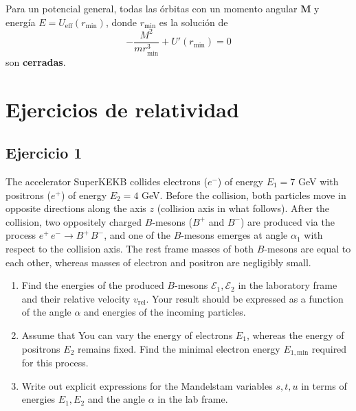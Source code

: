 \documentclass[]{report}
\numberwithin{equation}{section}
\newcommand{\0}{\textcolor{gray}{0}}
\newcommand{\eff}[1]{#1_\mathrm{eff}}
\newcommand{\Ueff}{\eff{U}}
\begin{document}
Para un potencial general, todas las órbitas con un momento angular \(\mathbf{M}\) y energía \(E = \Ueff(r_\mathrm{min})\), donde \(r_\mathrm{min}\) es la solución de
\begin{equation}
	-\frac{M^2}{m r_\mathrm{min}^3} + U'(r_\mathrm{min}) = 0 \label{EDO_orb_cerrada}
\end{equation}
son \textbf{cerradas}.

\chapter{Ejercicios de relatividad}
\section{Ejercicio 1}
The accelerator SuperKEKB collides electrons (\(e^{-}\)) of energy \(E_{1} = 7\) GeV with positrons (\(e^{+}\)) of energy \(E_{2} = 4\) GeV. Before the collision, both particles move in opposite directions along the axis \(z\) (collision axis in what follows). After the collision, two oppositely charged \(B\)-mesons (\(B^{+}\) and \(B^{-}\)) are produced via the process \(e^{+}\, e^{-} \rightarrow B^{+}\, B^{-}\), and one of the \(B\)-mesons emerges at angle \(\alpha_{1}\) with respect to the collision axis. The rest frame masses of both \(B\)-mesons are equal to each other, whereas masses of electron and positron are negligibly small.
\begin{enumerate}
	\item[a)] Find the energies of the produced \(B\)-mesons \(\mathcal{E}_{1}, \mathcal{E}_{2}\) in the laboratory frame and their relative velocity \(v_{\mathrm{rel}}\). Your result should be expressed as a function of the angle \(\alpha\) and energies of the incoming particles.
	\item[b)] Assume that You can vary the energy of electrons \(E_{1}\), whereas the energy of positrons \(E_{2}\) remains fixed. Find the minimal electron energy \(E_{1, \mathrm{min}}\) required for this process.
	\item[c)] Write out explicit expressions for the Mandelstam variables \(s, t, u\) in terms of energies \(E_{1}, E_{2}\) and the angle \(\alpha\) in the lab frame.
\end{enumerate}
\end{document}
